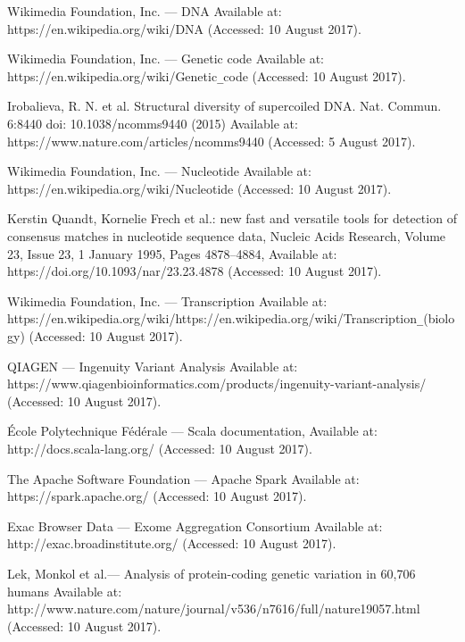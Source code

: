 \documentclass[a4paper,12pt,twoside]{article}
\begin{document}
\newpage

\begin{thebibliography}{99}

Wikimedia Foundation, Inc. — DNA
Available at: https://en.wikipedia.org/wiki/DNA (Accessed: 10 August 2017).

Wikimedia Foundation, Inc. — Genetic code
Available at: https://en.wikipedia.org/wiki/Genetic\verb!_!code (Accessed: 10 August 2017).

Irobalieva, R. N. et al. Structural diversity of supercoiled DNA. Nat. Commun. 6:8440 doi: 10.1038/ncomms9440 (2015) 
Available at: https://www.nature.com/articles/ncomms9440 (Accessed: 5 August 2017).

Wikimedia Foundation, Inc. — Nucleotide
Available at: https://en.wikipedia.org/wiki/Nucleotide (Accessed: 10 August 2017).

Kerstin Quandt, Kornelie Frech et al.: new fast and versatile tools for detection of consensus matches in nucleotide sequence data, Nucleic Acids Research, Volume 23, Issue 23, 1 January 1995, Pages 4878–4884, Available at: https://doi.org/10.1093/nar/23.23.4878 (Accessed: 10 August 2017).

Wikimedia Foundation, Inc. — Transcription
Available at: https://en.wikipedia.org/wiki/https://en.wikipedia.org/wiki/Transcription\verb!_!(biology) (Accessed: 10 August 2017).

QIAGEN — Ingenuity Variant Analysis
Available at: https://www.qiagenbioinformatics.com/products/ingenuity-variant-analysis/ (Accessed: 10 August 2017).

École Polytechnique Fédérale — Scala documentation,
Available at: http://docs.scala-lang.org/ (Accessed: 10 August 2017).

The Apache Software Foundation — Apache Spark Available at: https://spark.apache.org/ (Accessed: 10 August 2017).

Exac Browser Data — Exome Aggregation Consortium
Available at: http://exac.broadinstitute.org/ (Accessed: 10 August 2017).

Lek, Monkol et al.— Analysis of protein-coding genetic variation in 60,706 humans
Available at: http://www.nature.com/nature/journal/v536/n7616/full/nature19057.html
(Accessed: 10 August 2017).


\end{thebibliography}
\end{document}
